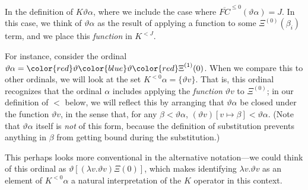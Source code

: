 \documentclass[11pt]{amsart}
\theoremstyle{definition}
\begin{document}
In the definition of $K\vartheta\alpha$, where we include the case where $\overline{FC}^{\leq 0}(\vartheta\alpha)=J$. In this case, we think of $\vartheta\alpha$ as the result of applying a function to some $\Xi^{(0)}(\beta_i)$ term, and we place this \emph{function} in $K^{< J}$.

For instance, consider the ordinal $\vartheta\alpha={\color{red}\vartheta}{\color{blue}\vartheta}{\color{red}\Xi}^{(1)}(0)$. When we compare this to other ordinals, we will look at the set $K^{< 0}\alpha=\{\vartheta v\}$. That is, this ordinal recognizes that the ordinal $\alpha$ includes applying the \emph{function} $\vartheta v$ to $\Xi^{(0)}$; in our definition of $<$ below, we will reflect this by arranging that $\vartheta\alpha$ be closed under the function $\vartheta v$, in the sense that, for any $\beta<\vartheta\alpha$, $(\vartheta v)[v\mapsto\beta]<\vartheta\alpha$. (Note that $\vartheta\alpha$ itself is \emph{not} of this form, because the definition of substitution prevents anything in $\beta$ from getting bound during the substitution.)

This perhaps looks more conventional in the alternative notation---we could think of this ordinal as $\vartheta\left[(\lambda v. \vartheta v)\Xi(0)\right]$, which makes identifying $\lambda v. \vartheta v$ as an element of $K^{<0}\alpha$ a natural interpretation of the $K$ operator in this context. 
\end{document}
